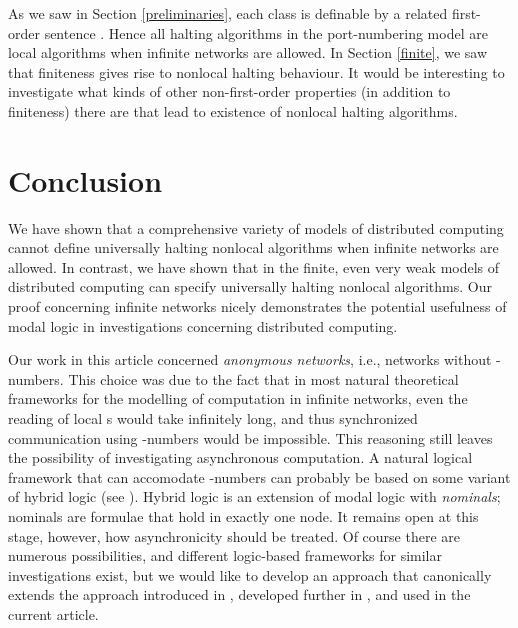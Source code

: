 \documentclass[copyright,creativecommons]{eptcs}
\begin{document}
As we saw in Section \ref{preliminaries}\hspace{0.4mm}, each class  is definable by a related first-order
sentence . Hence all halting algorithms in the port-numbering model 
are local algorithms when infinite networks are allowed.
In Section \ref{finite}\hspace{0.4mm}, we saw that finiteness gives rise to
nonlocal halting behaviour. It would be interesting to
investigate what kinds of other non-first-order properties (in addition to finiteness)
there are that lead to existence of nonlocal halting algorithms.




\section{Conclusion}




We have shown that a comprehensive variety of models of 
distributed computing cannot define universally halting nonlocal algorithms when
infinite networks are allowed.
In contrast, we have shown that in the finite, even very weak models of distributed
computing can specify universally halting nonlocal algorithms.
Our proof concerning infinite networks nicely demonstrates the potential
usefulness of modal logic in investigations
concerning distributed computing.




Our work in this article concerned \emph{anonymous networks},
i.e., networks without -numbers. This choice was due
to the fact that in most natural theoretical frameworks for the
modelling of computation in infinite networks,
even the reading of local s would take infinitely long, and thus synchronized
communication using -numbers would be impossible.
This reasoning still leaves the possibility of investigating asynchronous
computation. A natural logical framework that can accomodate 
-numbers can probably be based on 
some variant of hybrid logic (see \cite{Areces}).
Hybrid logic is an extension of modal logic with \emph{nominals};
nominals are formulae that hold in exactly one node.
It remains open at this stage, however,
how asynchronicity should be treated.  Of course there are numerous possibilities, and
different logic-based frameworks for similar investigations exist,
but we would like to develop an approach that canonically
extends the approach introduced in \cite{hella,hella2}, developed further in \cite{kuusi},
and used in the current article.
































\nocite{*}


\end{document}
